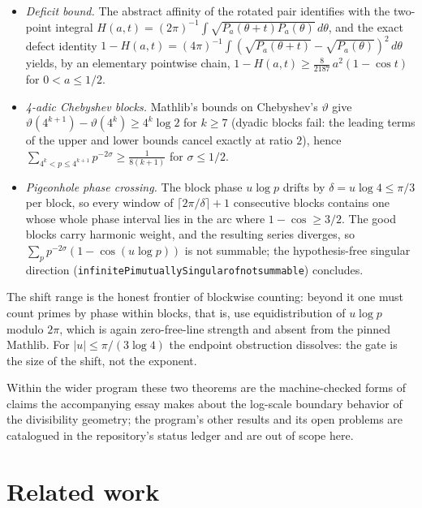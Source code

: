 \documentclass[a4paper,UKenglish,autoref,thm-restate]{lipics-v2021}
\newcommand{\leanid}[1]{{\def\_{\textunderscore\allowbreak}\texttt{#1}}}
\begin{document}
\begin{itemize}
\item \emph{Deficit bound.} The abstract affinity of the rotated pair
  identifies with the two-point integral
  $H(a,t) = (2\pi)^{-1}\int \sqrt{P_a(\theta+t) P_a(\theta)}\, d\theta$, and
  the exact defect identity
  $1 - H(a,t) = (4\pi)^{-1}\int (\sqrt{P_a(\theta+t)} -
  \sqrt{P_a(\theta)})^2\, d\theta$ yields, by an elementary pointwise chain,
  $1 - H(a,t) \ge \tfrac{8}{2187}\, a^2 (1 - \cos t)$ for $0 < a \le 1/2$.
\item \emph{4-adic Chebyshev blocks.} Mathlib's bounds on Chebyshev's
  $\vartheta$ give $\vartheta(4^{k+1}) - \vartheta(4^k) \ge 4^k \log 2$ for
  $k \ge 7$ (dyadic blocks fail: the leading terms of the upper and lower
  bounds cancel exactly at ratio $2$), hence
  $\sum_{4^k < p \le 4^{k+1}} p^{-2\sigma} \ge \tfrac{1}{8(k+1)}$ for
  $\sigma \le 1/2$.
\item \emph{Pigeonhole phase crossing.} The block phase $u \log p$ drifts by
  $\delta = u \log 4 \le \pi/3$ per block, so every window of
  $\lceil 2\pi/\delta \rceil + 1$ consecutive blocks contains one whose whole
  phase interval lies in the arc where $1 - \cos \ge 3/2$. The good blocks
  carry harmonic weight, and the resulting series diverges, so
  $\sum_p p^{-2\sigma}(1 - \cos(u \log p))$ is not summable; the
  hypothesis-free singular direction
  (\leanid{infinitePi\_mutuallySingular\_of\_not\_summable}) concludes.
\end{itemize}
The shift range is the honest frontier of blockwise counting: beyond it one
must count primes by phase within blocks, that is, use equidistribution of
$u \log p$ modulo $2\pi$, which is again zero-free-line strength and absent
from the pinned Mathlib. For $|u| \le \pi/(3 \log 4)$ the endpoint
obstruction dissolves: the gate is the size of the shift, not the exponent.

Within the wider program these two theorems are the machine-checked forms of
claims the accompanying essay makes about the log-scale boundary behavior of
the divisibility geometry; the program's other results and its open problems
are catalogued in the repository's status ledger \cite{riemannvenue} and are
out of scope here.

\section{Related work}
\label{sec:related}
\end{document}
